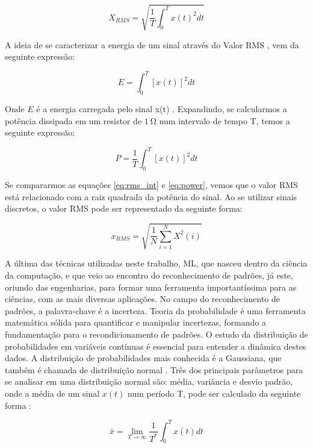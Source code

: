 \begin{equation}\label{eq:rms_int}
    X_{RMS} = \sqrt{\frac{1}{T}\int_{0}^{T}{x(t)^2dt}}
\end{equation}

A ideia de se caracterizar a energia de um sinal através do Valor RMS \cite{Cryer2010}, vem da seguinte expressão:

\begin{equation}\label{eq:energia}
    E = \int_{0}^{T}{[x(t)]^2dt}
\end{equation}

Onde $E$ é a energia carregada pelo sinal x(t) \cite{Oppenheim2016}. Expandindo, se calcularmos a potência dissipada em um resistor de
$\SI{1}{\ohm}$ num intervalo de tempo T, temos a seguinte expressão:

\begin{equation}\label{eq:power}
    P = \frac{1}{T}\int_{0}^{T}{[x(t)]^2dt}
\end{equation}

Se compararmos as equações \ref{eq:rms_int} e \ref{eq:power}, vemos que o valor RMS está relacionado com a raiz quadrada da potência do 
sinal. Ao se utilizar sinais discretos, o valor RMS pode ser representado da seguinte forma:

\begin{equation}\label{eq:rms_disc}
    x_{RMS} = \sqrt{\frac{1}{N}\sum_{i=1}^{N}{X^2(i)}}
\end{equation}

A última das técnicas utilizadas neste trabalho, ML, que nasceu dentro da ciência da computação, e que veio ao encontro do reconhecimento de 
padrões, já este, oriundo das engenharias, para formar uma ferramenta importantíssima para as ciências, com as mais diversas
aplicações. No campo do reconhecimento de padrões, a palavra-chave é a incerteza. Teoria da probabilidade é uma ferramenta matemática sólida
para quantificar e manipular incertezas, formando a fundamentação para o recondicionamento de padrões. O estudo da 
distribuição de probabilidades em variáveis contínuas é essencial para entender a dinâmica destes dados. A distribuição de probabilidades mais
conhecida é a Gaussiana, que também é chamada de distribuição normal \cite{Andersen1986}. Três dos principais parâmetros para se analisar
em uma distribuição normal são: média, variância e desvio padrão, onde a média de um sinal $x(t)$ num período T, pode ser calculado da seguinte
forma \cite{Dinardo}:

\begin{equation}\label{eq:X_lim}
    \bar{x} = \lim_{T\rightarrow\infty}{\frac{1}{T^*}} \int_{0}^{T}{x(t)dt}
\end{equation}

